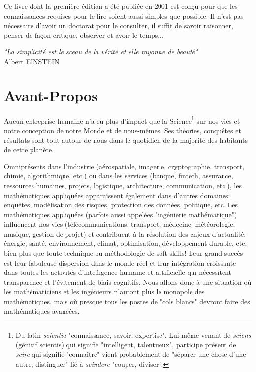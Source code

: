 	\newpage
	\thispagestyle{empty}
	\mbox{}
	Ce livre dont la première édition a été publiée en 2001 est conçu pour que les connaissances requises pour le lire soient aussi simples que possible. Il n'est pas nécessaire d'avoir un doctorat pour le consulter, il suffit de savoir raisonner, penser de façon critique, observer et avoir le temps...
	\begin{flushright}
	\textit{"La simplicité est le sceau de la vérité et elle rayonne de beauté"} \\
	 Albert EINSTEIN
	\end{flushright}
	
	\section{Avant-Propos}
	Aucun entreprise humaine n'a eu plus d'impact que la Science\footnote{Du latin \textit{scientia} "connaissance, savoir, expertise". Lui-même venant de \textit{sciens} (génitif scientis) qui signifie "intelligent, talentueux", participe présent de \textit{scire} qui signifie "connaître" vient probablement de "séparer une chose d'une autre, distinguer" lié à \textit{scindere} "couper, diviser".} sur nos vies et notre conception de notre Monde et de nous-mêmes. Ses théories, conquêtes et résultats sont tout autour de nous dans le quotidien de la majorité des habitants de cette planète.

	Omniprésents dans l'industrie (aérospatiale, imagerie, cryptographie, transport, chimie, algorithmique, etc.) ou dans les services (banque, fintech, assurance, ressources humaines, projets, logistique, architecture, communication, etc.), les mathématiques appliquées apparaîssent également dans d'autres domaines: enquêtes, modélisation des risques, protection des données, politique, etc. Les mathématiques appliquées (parfois aussi appelées "ingénierie mathématique") influencent nos vies (télécommunications, transport, médecine, météorologie, musique, gestion de projet) et contribuent à la résolution des enjeux d'actualité: énergie, santé, environnement, climat, optimisation, développement durable, etc. bien plus que toute technique ou méthodologie de soft skills! Leur grand succès est leur fabuleuse dispersion dans le monde réel et leur intégration croissante dans toutes les activités d'intelligence humaine et artificielle qui nécessitent transparence et l'évitement de biais cognitifs. Nous allons donc à une situation où les mathématiciens et les ingénieurs n'auront plus le monopole des mathématiques, mais où presque tous les postes de "cols blancs" devront faire des mathématiques avancées.

